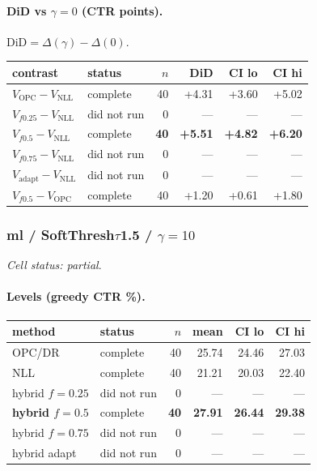 \documentclass[10pt,a4paper]{article}
\begin{document}
\paragraph{DiD vs $\gamma=0$ (CTR points).} $\mathrm{DiD}=\Delta(\gamma)-\Delta(0)$.
{\centering\small\begin{tabular}{llrrrr}
\toprule contrast & status & $n$ & DiD & CI lo & CI hi \\
\midrule
$V_{\mathrm{OPC}}-V_{\mathrm{NLL}}$ & complete & 40 & +4.31 & +3.60 & +5.02 \\
$V_{f0.25}-V_{\mathrm{NLL}}$ & did not run & 0 & --- & --- & --- \\
\textbf{$V_{f0.5}-V_{\mathrm{NLL}}$} & complete & \textbf{40} & \textbf{+5.51} & \textbf{+4.82} & \textbf{+6.20} \\
$V_{f0.75}-V_{\mathrm{NLL}}$ & did not run & 0 & --- & --- & --- \\
$V_{\mathrm{adapt}}-V_{\mathrm{NLL}}$ & did not run & 0 & --- & --- & --- \\
$V_{f0.5}-V_{\mathrm{OPC}}$ & complete & 40 & +1.20 & +0.61 & +1.80 \\
\bottomrule\end{tabular}\par}
\bigskip
\subsubsection{ml / SoftThresh$\tau$1.5 / $\gamma=10$}
\emph{Cell status: partial}.
\paragraph{Levels (greedy CTR \%).}
{\centering\small\begin{tabular}{llrrrr}
\toprule method & status & $n$ & mean & CI lo & CI hi \\
\midrule
OPC/DR & complete & 40 & 25.74 & 24.46 & 27.03 \\
NLL & complete & 40 & 21.21 & 20.03 & 22.40 \\
hybrid $f{=}0.25$ & did not run & 0 & --- & --- & --- \\
\textbf{hybrid $f{=}0.5$} & complete & \textbf{40} & \textbf{27.91} & \textbf{26.44} & \textbf{29.38} \\
hybrid $f{=}0.75$ & did not run & 0 & --- & --- & --- \\
hybrid adapt & did not run & 0 & --- & --- & --- \\
\bottomrule\end{tabular}\par}
\end{document}
